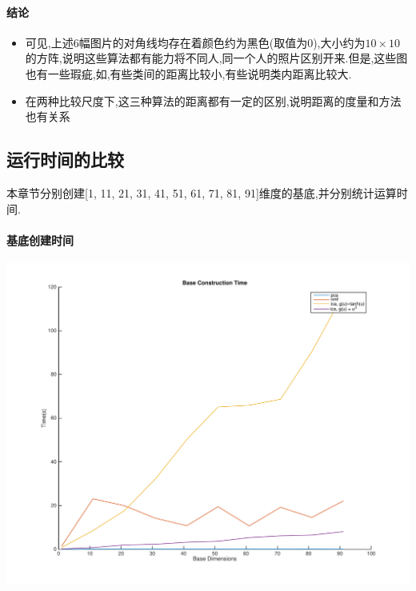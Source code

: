 \paragraph{结论}
\begin{itemize}
	\item 可见,上述6幅图片的对角线均存在着颜色约为黑色(取值为0),大小约为$10 \times 10$的方阵,说明这些算法都有能力将不同人,同一个人的照片区别开来.但是,这些图也有一些瑕疵,如,有些类间的距离比较小,有些说明类内距离比较大.
	\item 在两种比较尺度下,这三种算法的距离都有一定的区别,说明距离的度量和方法也有关系
\end{itemize}

\subsection{运行时间的比较}
\label{sec:pni_cal_time}
本章节分别创建[1, 11, 21, 31, 41, 51, 61, 71, 81, 91]维度的基底,并分别统计运算时间.
\paragraph{基底创建时间}
\begin{center}
\begin{minipage}[t]{\linewidth}
\center
{
\includegraphics[width=\textwidth]{Img/pni_baseconstr} 
\label{fig:ica_base}
}
\end{minipage}
\medskip
\end{center}

